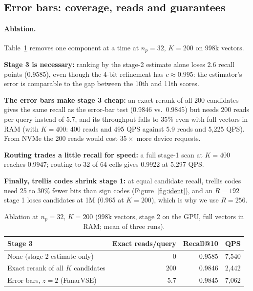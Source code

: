 \documentclass[fleqn,10pt]{wlscirep}
\begin{document}
\subsection{Error bars: coverage, reads and guarantees}
\paragraph{Ablation.} Table~\ref{tab:ablation} removes one component at a time at $n_p=32$, $K=200$ on 998k vectors.

\textbf{Stage 3 is necessary:} ranking by the stage-2 estimate alone loses 2.6 recall points (0.9585), even though the 4-bit refinement has $c\approx0.995$: the estimator's error is comparable to the gap between the 10th and 11th scores.

\textbf{The error bars make stage 3 cheap:} an exact rerank of all 200 candidates gives the same recall as the error-bar test (0.9846 vs.\ 0.9845) but needs 200 reads per query instead of 5.7, and its throughput falls to 35\% even with full vectors in RAM (with $K=400$: 400 reads and 495 QPS against 5.9 reads and 5{,}225 QPS). From NVMe the 200 reads would cost $35\times$ more device requests.

\textbf{Routing trades a little recall for speed:} a full stage-1 scan at $K=400$ reaches 0.9947; routing to 32 of 64 cells gives 0.9922 at 5{,}297 QPS.

\textbf{Finally, trellis codes shrink stage 1:} at equal candidate recall, trellis codes need 25 to 30\% fewer bits than sign codes (Figure~\ref{fig:ident}), and an $R=192$ stage 1 loses candidates at 1M (0.965 at $K=200$), which is why we use $R=256$.

\begin{table}[!htbp]
\caption{Ablation at $n_p=32$, $K=200$ (998k vectors, stage 2 on the GPU, full vectors in RAM; mean of three runs).}
\label{tab:ablation}
\small
\begin{tabular}{lrrr}
\toprule
Stage 3 & Exact reads/query & Recall@10 & QPS \\
\midrule
None (stage-2 estimate only) & 0 & 0.9585 & 7{,}540 \\
Exact rerank of all $K$ candidates & 200 & 0.9846 & 2{,}442 \\
Error bars, $z=2$ (FanarVSE) & 5.7 & 0.9845 & 7{,}062 \\
\bottomrule
\end{tabular}
\end{table}
\end{document}
